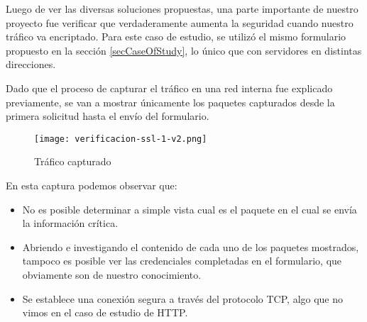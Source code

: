 Luego de ver las diversas soluciones propuestas, una parte importante de 
nuestro proyecto fue verificar que verdaderamente aumenta la seguridad
cuando nuestro tráfico va encriptado. Para este caso de estudio, se utilizó
el mismo formulario propuesto en la sección \ref{secCaseOfStudy}, lo 
único que con servidores en distintas direcciones.

Dado que el proceso de capturar el tráfico en una red interna fue
explicado previamente, se van a mostrar únicamente los paquetes capturados
desde la primera solicitud hasta el envío del formulario.

\begin{center}
   \begin{figure}   
      \begin{center}
         \texttt{[image: verificacion-ssl-1-v2.png]}
      \end{center}
      \caption{Tráfico capturado}
   \end{figure}
\end{center}

En esta captura podemos observar que:
\begin{itemize}
   \setlength\itemsep{-0.6em}
   \item No es posible determinar a simple vista cual es el paquete 
   en el cual se envía la información crítica.
   \item Abriendo e investigando el contenido de cada uno de los paquetes mostrados,
   tampoco es posible ver las credenciales completadas en el formulario, 
   que obviamente son de nuestro conocimiento.
   \item Se establece una conexión segura a través del protocolo TCP, algo que no 
   vimos en el caso de estudio de HTTP.
\end{itemize}


